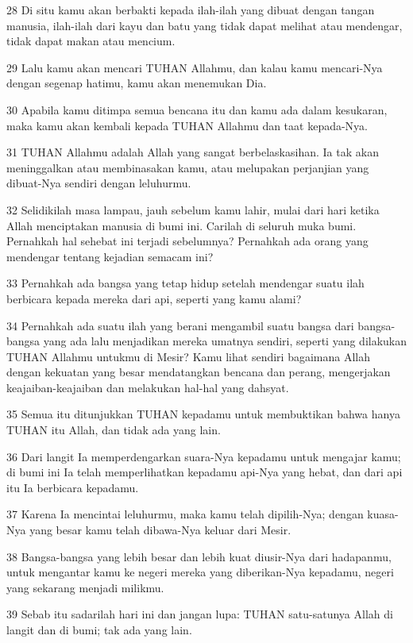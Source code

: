 \par 28 Di situ kamu akan berbakti kepada ilah-ilah yang dibuat dengan tangan manusia, ilah-ilah dari kayu dan batu yang tidak dapat melihat atau mendengar, tidak dapat makan atau mencium.
\par 29 Lalu kamu akan mencari TUHAN Allahmu, dan kalau kamu mencari-Nya dengan segenap hatimu, kamu akan menemukan Dia.
\par 30 Apabila kamu ditimpa semua bencana itu dan kamu ada dalam kesukaran, maka kamu akan kembali kepada TUHAN Allahmu dan taat kepada-Nya.
\par 31 TUHAN Allahmu adalah Allah yang sangat berbelaskasihan. Ia tak akan meninggalkan atau membinasakan kamu, atau melupakan perjanjian yang dibuat-Nya sendiri dengan leluhurmu.
\par 32 Selidikilah masa lampau, jauh sebelum kamu lahir, mulai dari hari ketika Allah menciptakan manusia di bumi ini. Carilah di seluruh muka bumi. Pernahkah hal sehebat ini terjadi sebelumnya? Pernahkah ada orang yang mendengar tentang kejadian semacam ini?
\par 33 Pernahkah ada bangsa yang tetap hidup setelah mendengar suatu ilah berbicara kepada mereka dari api, seperti yang kamu alami?
\par 34 Pernahkah ada suatu ilah yang berani mengambil suatu bangsa dari bangsa-bangsa yang ada lalu menjadikan mereka umatnya sendiri, seperti yang dilakukan TUHAN Allahmu untukmu di Mesir? Kamu lihat sendiri bagaimana Allah dengan kekuatan yang besar mendatangkan bencana dan perang, mengerjakan keajaiban-keajaiban dan melakukan hal-hal yang dahsyat.
\par 35 Semua itu ditunjukkan TUHAN kepadamu untuk membuktikan bahwa hanya TUHAN itu Allah, dan tidak ada yang lain.
\par 36 Dari langit Ia memperdengarkan suara-Nya kepadamu untuk mengajar kamu; di bumi ini Ia telah memperlihatkan kepadamu api-Nya yang hebat, dan dari api itu Ia berbicara kepadamu.
\par 37 Karena Ia mencintai leluhurmu, maka kamu telah dipilih-Nya; dengan kuasa-Nya yang besar kamu telah dibawa-Nya keluar dari Mesir.
\par 38 Bangsa-bangsa yang lebih besar dan lebih kuat diusir-Nya dari hadapanmu, untuk mengantar kamu ke negeri mereka yang diberikan-Nya kepadamu, negeri yang sekarang menjadi milikmu.
\par 39 Sebab itu sadarilah hari ini dan jangan lupa: TUHAN satu-satunya Allah di langit dan di bumi; tak ada yang lain.
